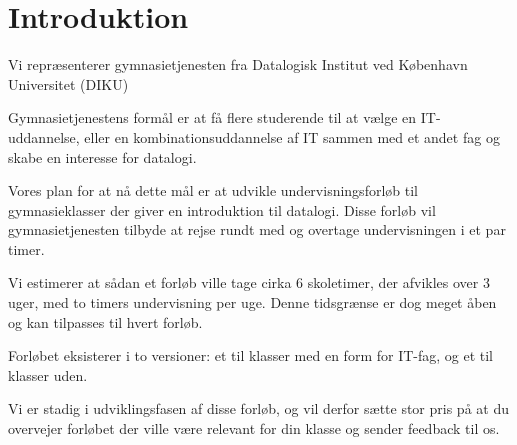 \documentclass[11pt]{article}
\begin{document}
    \newpage                %
    \setcounter{page}{1}    %

\section{Introduktion}
    Vi repræsenterer gymnasietjenesten fra
    Datalogisk Institut ved København Universitet (DIKU)

    Gymnasietjenestens formål er at få flere studerende til at vælge en
    IT-uddannelse, eller en kombinationsuddannelse af IT sammen med et andet fag
    og skabe en interesse for datalogi.

    Vores plan for at nå dette mål er at udvikle undervisningsforløb til
    gymnasieklasser der giver en introduktion til datalogi. Disse forløb vil
    gymnasietjenesten tilbyde at rejse rundt med og overtage undervisningen i et
    par timer.

    Vi estimerer at sådan et forløb ville tage cirka 6 skoletimer, der afvikles
    over 3 uger, med to timers undervisning per uge. Denne tidsgrænse er dog
    meget åben og kan tilpasses til hvert forløb.

    Forløbet eksisterer i to versioner: et til klasser med en form for IT-fag,
    og et til klasser uden.

    Vi er stadig i udviklingsfasen af disse forløb, og vil derfor sætte stor
    pris på at du overvejer forløbet der ville være relevant for din
    klasse og sender feedback til os.
\end{document}
